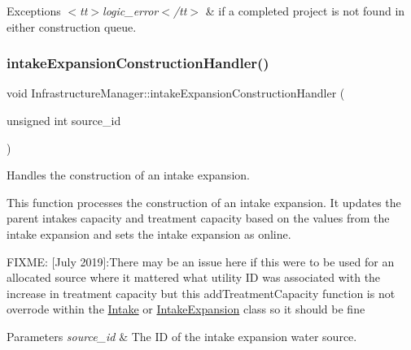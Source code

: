 \begin{DoxyExceptions}{Exceptions}
{\em $<$tt$>$logic\+\_\+error$<$/tt$>$} & if a completed project is not found in either construction queue. \\
\hline
\end{DoxyExceptions}
\mbox{\label{classInfrastructureManager_aed62e86a9737e385c821d44ea70922e9}} 
\subsubsection{\texorpdfstring{intake\+Expansion\+Construction\+Handler()}{intakeExpansionConstructionHandler()}}
{\footnotesize\ttfamily void Infrastructure\+Manager\+::intake\+Expansion\+Construction\+Handler (\begin{DoxyParamCaption}\item[{unsigned int}]{source\+\_\+id }\end{DoxyParamCaption})}



Handles the construction of an intake expansion. 

This function processes the construction of an intake expansion. It updates the parent intake\textquotesingle{}s capacity and treatment capacity based on the values from the intake expansion and sets the intake expansion as online.

F\+I\+X\+ME\+: \mbox{[}July 2019\mbox{]}\+:There may be an issue here if this were to be used for an allocated source where it mattered what utility ID was associated with the increase in treatment capacity but this add\+Treatment\+Capacity function is not overrode within the \mbox{\hyperlink{classIntake}{Intake}} or \mbox{\hyperlink{classIntakeExpansion}{Intake\+Expansion}} class so it should be fine


\begin{DoxyParams}{Parameters}
{\em source\+\_\+id} & The ID of the intake expansion water source. \\
\hline
\end{DoxyParams}
\mbox{\label{classInfrastructureManager_ad016a00ca49b1896e94a04f723209a64}} 
